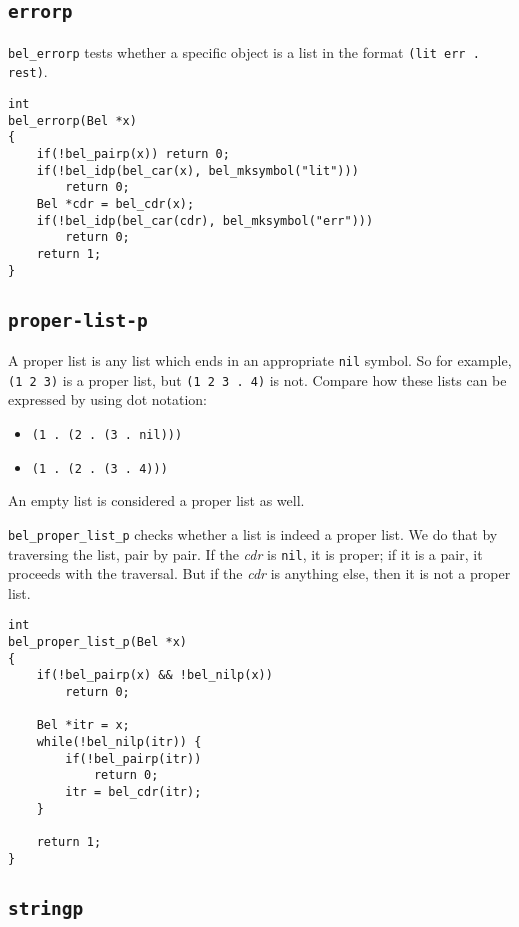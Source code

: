 \documentclass[openright,a4paper,twoside,12pt]{memoir}
\begin{document}
\subsection{\texttt{errorp}}
\label{sec:org0d13478}

\texttt{bel\_errorp} tests whether a specific object is a list in the format
\texttt{(lit err . rest)}.

\begin{verbatim}
int
bel_errorp(Bel *x)
{
    if(!bel_pairp(x)) return 0;
    if(!bel_idp(bel_car(x), bel_mksymbol("lit")))
        return 0;
    Bel *cdr = bel_cdr(x);
    if(!bel_idp(bel_car(cdr), bel_mksymbol("err")))
        return 0;
    return 1;
}
\end{verbatim}

\subsection{\texttt{proper-list-p}}
\label{sec:org1abc631}

A proper list is any list which ends in an appropriate \texttt{nil} symbol. So
for example, \texttt{(1 2 3)} is a proper list, but \texttt{(1 2 3 . 4)} is not. Compare
how these lists can be expressed by using dot notation:

\begin{itemize}
\item \texttt{(1 . (2 . (3 . nil)))}
\item \texttt{(1 . (2 . (3 . 4)))}
\end{itemize}

An empty list is considered a proper list as well.

\texttt{bel\_proper\_list\_p} checks whether a list is indeed a proper list. We do
that by traversing the list, pair by pair. If the \emph{cdr} is \texttt{nil}, it is
proper; if it is a pair, it proceeds with the traversal. But if the \emph{cdr}
is anything else, then it is not a proper list.

\begin{verbatim}
int
bel_proper_list_p(Bel *x)
{
    if(!bel_pairp(x) && !bel_nilp(x))
        return 0;
    
    Bel *itr = x;
    while(!bel_nilp(itr)) {
        if(!bel_pairp(itr))
            return 0;
        itr = bel_cdr(itr);
    }

    return 1;
}
\end{verbatim}

\subsection{\texttt{stringp}}
\label{sec:orgb04af6e}
\end{document}
